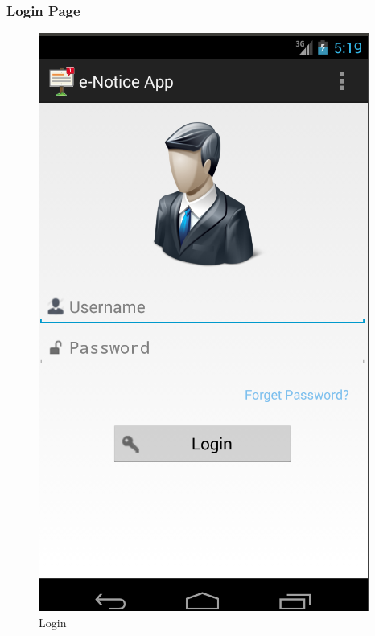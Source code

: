 \documentclass{beamer}   %
\begin{document}
\begin{frame}
\frametitle{Login Page}
\begin{figure}
\includegraphics[scale=0.2]{image/login.png}
\caption{Login}
\end{figure}
\end{frame}
\end{document}
